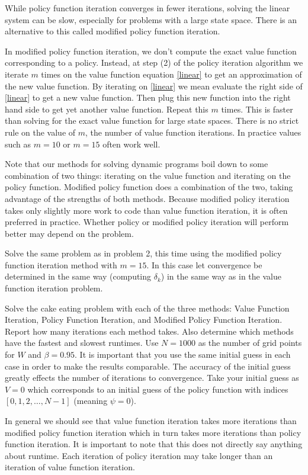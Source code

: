 While policy function iteration converges in fewer iterations, solving the linear system can be slow, especially for problems with a large state space.  There is an alternative to this called modified policy function iteration.

In modified policy function iteration, we don't compute the exact value function corresponding to a policy.  Instead, at step (2) of the policy iteration algorithm we iterate $m$ times on the value function equation \eqref{linear} to get an approximation of the new value function.  By iterating on \eqref{linear} we mean evaluate the right side of \eqref{linear} to get a new value function.  Then plug this new function into the right hand side to get yet another value function.  Repeat this $m$ times.  This is faster than solving for the exact value function for large state spaces.  There is no strict rule on the value of $m$, the number of value function iterations.  In practice values such as $m=10$ or $m=15$ often work well.

Note that our methods for solving dynamic programs boil down to some combination of two things: iterating on the value function and iterating on the policy function.  Modified policy function does a combination of the two, taking advantage of the strengths of both methods.  Because modified policy iteration takes only slightly more work to code than value function iteration, it is often preferred in practice.  Whether policy or modified policy iteration will perform better may depend on the problem.

\begin{problem}
Solve the same problem as in problem 2, this time using the modified policy function iteration method with $m=15$.  In this case let convergence be determined in the same way (computing $\delta_k$) in the same way as in the value function iteration problem.
\end{problem}

\begin{problem}
Solve the cake eating problem with each of the three methods: Value Function Iteration, Policy Function Iteration, and Modified Policy Function Iteration.  Report how many iterations each method takes.  Also determine which methods have the fastest and slowest runtimes.  Use $N= 1000$ as the number of grid points for $W$ and $\beta = 0.95$.  It is important that you use the same initial guess in each case in order to make the results comparable.  The accuracy of the initial guess greatly effects the number of iterations to convergence.  Take your initial guess as $V = 0$ which corresponds to an initial guess of the policy function with indices $[0,1,2,\ldots, N-1]$ (meaning $\psi = 0$).
\end{problem}

In general we should see that value function iteration takes more iterations than modified policy function iteration which in turn takes more iterations than policy function iteration.  It is important to note that this does not directly say anything about runtime.  Each iteration of policy iteration may take longer than an iteration of value function iteration.

